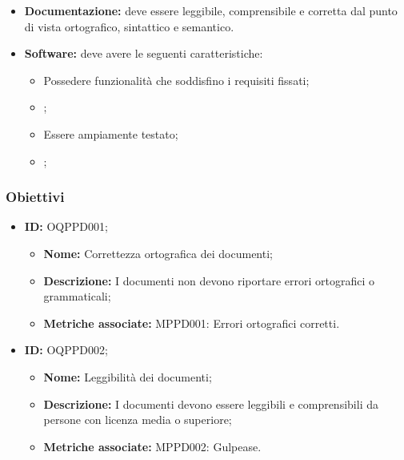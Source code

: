 \documentclass[openany,12pt,a4paper]{report}
\begin{document}
    \begin{itemize}
        \item \textbf{Documentazione:} deve essere leggibile, comprensibile e corretta dal punto di vista ortografico, sintattico e semantico.
        
        \item \textbf{Software:} deve avere le seguenti caratteristiche:
        \begin{itemize}
            \item Possedere funzionalità che soddisfino i requisiti fissati;
            \item {};
            \item Essere ampiamente testato;
            \item {};
        \end{itemize}
    \end{itemize}
    
    \subsubsection{Obiettivi}
        
        \begin{itemize}
            \item \textbf{ID:} OQPPD001;
            \begin{itemize}            	
            	\item \textbf{Nome:} Correttezza ortografica dei documenti;
            	\item \textbf{Descrizione:} I documenti non devono riportare errori ortografici o grammaticali;
            	\item \textbf{Metriche associate:} MPPD001: Errori ortografici corretti.
        	\end{itemize}
        \end{itemize} 
        
        \begin{itemize}
            \item \textbf{ID:} OQPPD002;
            \begin{itemize} 
            	\item \textbf{Nome:} Leggibilità dei documenti;
            	\item \textbf{Descrizione:} I documenti devono essere leggibili e comprensibili da persone con licenza media o superiore;
            	\item \textbf{Metriche associate:} MPPD002: Gulpease.
            \end{itemize}
        \end{itemize} 
        
\end{document}
